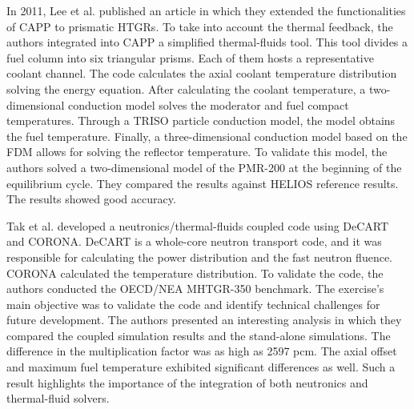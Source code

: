 In 2011, Lee et al. published an article \cite{lee_development_2011} in which they extended the functionalities of CAPP to prismatic \glspl{HTGR}.
To take into account the thermal feedback, the authors integrated into CAPP a simplified thermal-fluids tool.
This tool divides a fuel column into six triangular prisms.
Each of them hosts a representative coolant channel.
The code calculates the axial coolant temperature distribution solving the energy equation.
After calculating the coolant temperature, a two-dimensional conduction model solves the moderator and fuel compact temperatures.
Through a TRISO particle conduction model, the model obtains the fuel temperature.
Finally, a three-dimensional conduction model based on the \gls{FDM} allows for solving the reflector temperature.
To validate this model, the authors solved a two-dimensional model of the PMR-200 at the beginning of the equilibrium cycle.
They compared the results against HELIOS reference results.
The results showed good accuracy.

Tak et al. \cite{tak_coupled_2016} developed a neutronics/thermal-fluids coupled code using DeCART \cite{kaeri_decart_2007} and CORONA.
DeCART is a whole-core neutron transport code, and it was responsible for calculating the power distribution and the fast neutron fluence.
CORONA calculated the temperature distribution.
To validate the code, the authors conducted the OECD/NEA MHTGR-350 benchmark.
The exercise's main objective was to validate the code and identify technical challenges for future development.
The authors presented an interesting analysis in which they compared the coupled simulation results and the stand-alone simulations.
The difference in the multiplication factor was as high as 2597 pcm.
The axial offset and maximum fuel temperature exhibited significant differences as well.
Such a result highlights the importance of the integration of both neutronics and thermal-fluid solvers.

